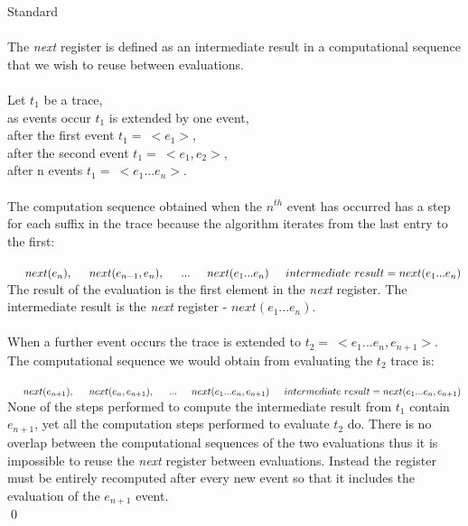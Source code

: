 \begin{myEx} Standard \RH\\
\\
\noindent
The \textit{next} register is defined as an intermediate result in a computational sequence that we wish to reuse between evaluations.\\
\\
\indent Let $t_1$ be a trace,\\
\indent as events occur $t_1$ is extended by one event,\\
\indent after the first event $t_1 =\ <e_1>$,\\
\indent after the second event $t_1 =\ <e_1, e_2>$,\\
\indent after n events $t_1 =\ <e_1 ... e_n>$.\\
\\
The computation sequence obtained when the $n^{th}$ event has occurred has a step for each suffix in the trace because the algorithm iterates from the last entry to the first:\\
\\$
\indent next(e_n),\\
\indent next(e_{n-1}, e_n),\\
\indent ...\\
\indent next(e_1 ... e_n)\\
\\
\indent intermediate\ result = next(e_1 ... e_n)\\
$\\
The result of the evaluation is the first element in the \textit{next} register.  The intermediate result is the \textit{next} register - $next(e_1 ... e_n)$.\\
\\
When a further event occurs the trace is extended to $t_2 =\ <e_1 ... e_n, e_{n+1}>$.  The computational sequence we would obtain from evaluating the  $t_2$ trace is:\\
\\$
\indent next(e_{n+1}),\\
\indent next(e_n, e_{n+1}),\\
\indent ...\\
\indent next(e_1 ... e_n, e_{n+1})\\
\\
\indent intermediate\ result = next(e_1 ... e_n, e_{n+1})\\
$\\
None of the steps performed to compute the intermediate result from $t_1$ contain $e_{n+1}$, yet all the computation steps performed to evaluate $t_2$ do.  There is no overlap between the computational sequences of the two evaluations thus it is impossible to reuse the \textit{next} register between evaluations.  Instead the register must be entirely recomputed after every new event so that it includes the evaluation of the $e_{n+1}$ event.
\\
\qed
\end{myEx}


